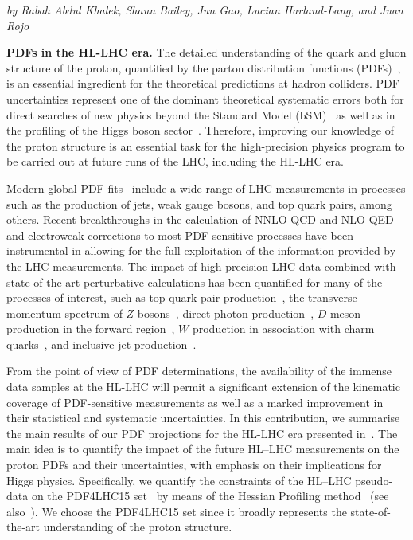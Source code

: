 \begin{center}
  \textit{by Rabah Abdul Khalek, Shaun Bailey,
    Jun Gao, Lucian Harland-Lang,  and Juan Rojo}
\end{center}

{\bf PDFs in the HL-LHC era.}
%
The detailed understanding of the quark and gluon
structure of the proton, quantified by the parton distribution functions
(PDFs)~\cite{Gao:2017yyd,Rojo:2015acz,Forte:2013wc},
is an essential ingredient for the theoretical predictions at hadron colliders.
%
PDF uncertainties represent one of the dominant theoretical systematic
errors
both for direct searches of new physics beyond the Standard
Model (bSM)~\cite{Beenakker:2015rna}
as well as in
the profiling of the Higgs boson sector~\cite{deFlorian:2016spz}.
%
Therefore, improving our knowledge of the proton structure
is an essential task for the high-precision physics
program to be carried out at future runs of the LHC, including
the HL-LHC era.

Modern global PDF fits~\cite{Ball:2017nwa,Dulat:2015mca,
  Harland-Lang:2014zoa,Alekhin:2017kpj}
include a wide range of LHC measurements in
processes such as the production of jets, weak gauge bosons,
and top quark pairs, among others.
%
Recent breakthroughs in the calculation
of NNLO QCD and NLO QED and electroweak corrections to
most PDF-sensitive processes have been instrumental in
allowing for the full exploitation of the information provided by the LHC measurements.
%
The impact of high-precision LHC data combined with state-of-the art
perturbative calculations has been quantified for many of the processes
of interest, such as top-quark pair production~\cite{Czakon:2016olj,Guzzi:2014wia},
the transverse momentum spectrum of $Z$ bosons~\cite{Boughezal:2017nla}, 
direct photon production~\cite{dEnterria:2012yj,Campbell:2018wfu},
$D$ meson production in the forward region~\cite{Gauld:2015yia,Zenaiev:2015rfa,Gauld:2016kpd}, $W$ production
in association with charm quarks~\cite{Aad:2014xca,Chatrchyan:2013mza},
and inclusive jet production~\cite{Currie:2016bfm,Rojo:2014kta}.

From the point of view of PDF determinations, the availability of the
immense data samples at the HL-LHC
will permit a significant extension
of the kinematic coverage of PDF-sensitive measurements
as well as a marked improvement in their statistical and systematic uncertainties.
%
In this contribution, we summarise the main results
of our PDF projections for the HL-LHC era presented
in~\cite{Khalek:2018mdn}.
%
The main idea is to quantify the impact of the future HL--LHC
measurements on the proton PDFs and their
uncertainties, with emphasis on
their implications for Higgs physics.
%
Specifically, we quantify the 
constraints of the HL--LHC pseudo-data
on the PDF4LHC15
set~\cite{Butterworth:2015oua,Gao:2013bia,Carrazza:2015hva,Carrazza:2015aoa}
by means
of the Hessian Profiling
method~\cite{Paukkunen:2014zia} (see also~\cite{Schmidt:2018hvu}).
%
We choose the PDF4LHC15 set since it broadly represents
the state-of-the-art understanding of
the proton structure.

